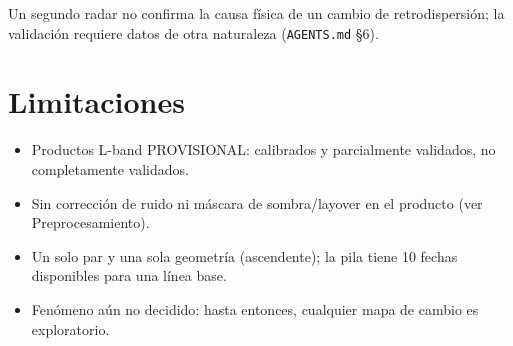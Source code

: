 \documentclass[11pt,a4paper]{article}
\begin{document}
Un segundo radar no confirma la causa física de un cambio de retrodispersión; la validación requiere datos
de otra naturaleza (\texttt{AGENTS.md} §6).

\section{Limitaciones}

\begin{itemize}
  \item Productos L-band PROVISIONAL: calibrados y parcialmente validados, no completamente validados.
  \item Sin corrección de ruido ni máscara de sombra/layover en el producto (ver Preprocesamiento).
  \item Un solo par y una sola geometría (ascendente); la pila tiene 10 fechas disponibles para una línea base.
  \item Fenómeno aún no decidido: hasta entonces, cualquier mapa de cambio es exploratorio.
\end{itemize}
\end{document}
